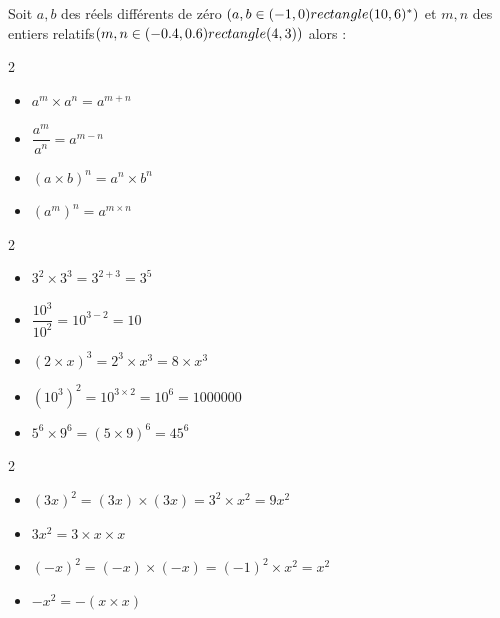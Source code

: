 \begin{Propriété}
Soit $a,b$ des réels différents de zéro $(a,b \in (-1,0) rectangle (10,6)^\ast)$ et $m,n$ des entiers relatifs$(m,n \in (-0.4,0.6) rectangle (4,3))$ alors : 
\vspace{-0.5cm}
\begin{multicols}{2}
\begin{itemize}[label=\textcolor{Couleur2}{$\bullet$}]
\item $a^m\times a^n=a^{m+n}$
\item $\dfrac{a^m}{a^n}=a^{m-n}$
\item $(a\times b)^n=a^n\times b^n$
\item $(a^m)^n=a^{m\times n}$
\end{itemize}
\end{multicols}
\end{Propriété}

\begin{Exemples}
\leavevmode\vspace{-\baselineskip}
\vspace{-0.5cm}
\begin{multicols}{2}
\begin{itemize}[label=\textcolor{Couleur10}{$\bullet$}]
\item $3^2\times 3^3=3^{2+3}=3^5$
\item $\dfrac{10^3}{10^2}={10}^{3-2}=10$
\item $(2\times x)^{3}=2^3\times x^3=8\times x^3$
\item $(10^3)^2=10^{3\times 2}=10^6=1000000$
\item $5^6\times 9^6=(5\times 9)^6=45^6$
\end{itemize}
\end{multicols}
\end{Exemples}

\begin{Remarque}
\leavevmode\vspace{-\baselineskip}
\vspace{-0.3cm}
\begin{multicols}{2}
\begin{itemize}[label=\textcolor{Couleur7}{$\bullet$}]
\item $(3x)^2=(3x)\times (3x)=3^2\times x^2=9x^2$
\item $3x^2=3\times x\times x$
\item $(-x)^2=(-x)\times (-x)=(-1)^2\times x^2=x^2$
\item $-x^2=-(x\times x)$
\end{itemize}
\end{multicols}
\end{Remarque}

